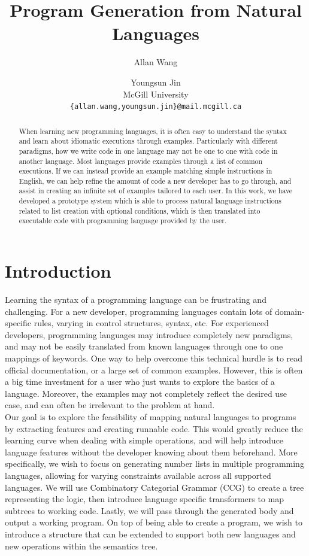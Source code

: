 \documentclass[11pt,letterpaper]{article}
\title{Program Generation from Natural Languages}
\author{Allan Wang \and Youngsun Jin \\
        McGill University \\ \tt{\{allan.wang,youngsun.jin\}@mail.mcgill.ca}}
\date{}
\begin{document}
\maketitle

\begin{abstract}
  When learning new programming languages, it is often easy to understand the syntax and learn
  about idiomatic executions through examples. Particularly with different paradigms, how we
  write code in one language may not be one to one with code in another language. Most
  languages provide examples through a list of common executions. If we can instead provide an
  example matching simple instructions in English, we can help refine the amount of code
  a new developer has to go through, and assist in creating an infinite set of examples tailored to
  each user. In this work, we have developed a prototype system which is able to process natural language instructions
  related to list creation with optional conditions, which is then translated into executable code with programming language provided by the user.
\end{abstract}

\section{Introduction}
Learning the syntax of a programming language can be frustrating and challenging. 
For a new developer, programming languages contain lots of domain-specific rules, varying in control structures, syntax, etc.
For experienced developers, programming languages may introduce completely new paradigms, and may not be easily translated from known languages through one to one mappings of keywords.
One way to help overcome this technical hurdle is to read official documentation, or a large set of common examples.
However, this is often a big time investment for a user who just wants to explore the basics of a language.
Moreover, the examples may not completely reflect the desired use case, and can often be irrelevant to the problem at hand.\\

Our goal is to explore the feasibility of mapping natural languages to programs by extracting features and creating runnable code.
This would greatly reduce the learning curve when dealing with simple operations, and will help introduce language features without the developer knowing about them beforehand.
More specifically, we wish to focus on generating number lists in multiple programming languages, allowing for varying constraints available across all supported languages.
We will use Combinatory Categorial Grammar (CCG) to create a tree representing the logic, then introduce language specific transformers to map subtrees to working code.
Lastly, we will pass through the generated body and output a working program.
On top of being able to create a program, we wish to introduce a structure that can be extended to support both new languages and new operations within the semantics tree.
\end{document}
